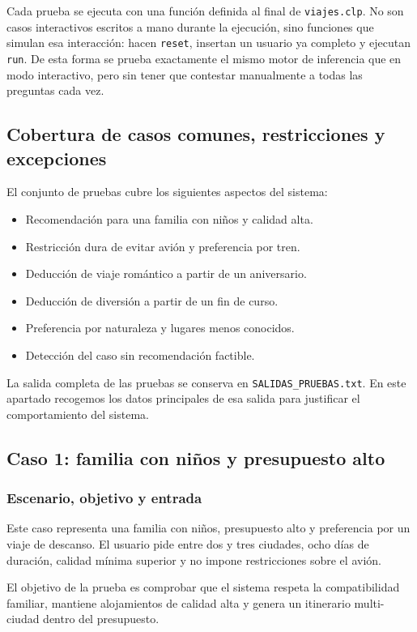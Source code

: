 \documentclass[11pt,a4paper]{article}
\begin{document}
Cada prueba se ejecuta con una funci\'on definida al final de
\texttt{viajes.clp}. No son casos interactivos escritos a mano durante la
ejecuci\'on, sino funciones que simulan esa interacci\'on: hacen \texttt{reset},
insertan un usuario ya completo y ejecutan \texttt{run}. De esta forma se prueba
exactamente el mismo motor de inferencia que en modo interactivo, pero sin
tener que contestar manualmente a todas las preguntas cada vez.

\subsection{Cobertura de casos comunes, restricciones y excepciones}
El conjunto de pruebas cubre los siguientes aspectos del sistema:
\begin{itemize}
    \item Recomendaci\'on para una familia con ni\~nos y calidad alta.
    \item Restricci\'on dura de evitar avi\'on y preferencia por tren.
    \item Deducci\'on de viaje rom\'antico a partir de un aniversario.
    \item Deducci\'on de diversi\'on a partir de un fin de curso.
    \item Preferencia por naturaleza y lugares menos conocidos.
    \item Detecci\'on del caso sin recomendaci\'on factible.
\end{itemize}

La salida completa de las pruebas se conserva en
\texttt{SALIDAS\_PRUEBAS.txt}. En este apartado recogemos los datos principales
de esa salida para justificar el comportamiento del sistema.

\subsection{Caso 1: familia con ni\~nos y presupuesto alto}
\subsubsection{Escenario, objetivo y entrada}
Este caso representa una familia con ni\~nos, presupuesto alto y preferencia por
un viaje de descanso. El usuario pide entre dos y tres ciudades, ocho d\'ias de
duraci\'on, calidad m\'inima superior y no impone restricciones sobre el avi\'on.

El objetivo de la prueba es comprobar que el sistema respeta la compatibilidad
familiar, mantiene alojamientos de calidad alta y genera un itinerario
multi-ciudad dentro del presupuesto.
\end{document}
